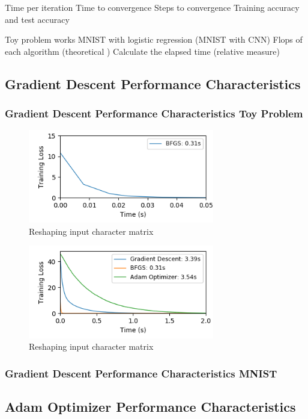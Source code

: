 \documentclass[10pt,twocolumn]{article}
\begin{document}
Time per iteration
Time to convergence 
Steps to convergence
Training accuracy and test accuracy 

Toy problem works
MNIST with logistic regression
(MNIST with CNN)
Flops of each algorithm (theoretical )
Calculate the elapsed time (relative measure)


\subsection{Gradient Descent Performance Characteristics}




\subsubsection{Gradient Descent Performance Characteristics Toy Problem}


\begin{figure}
\includegraphics[width=3.2in]{./ToyLossBFGS.png}
\caption{Reshaping input character matrix}
\end{figure}


\begin{figure}
\includegraphics[width=3.2in]{./ToyLoss.png}
\caption{Reshaping input character matrix}
\end{figure}




\subsubsection{Gradient Descent Performance Characteristics MNIST}

\subsection{Adam Optimizer Performance Characteristics}
\end{document}
